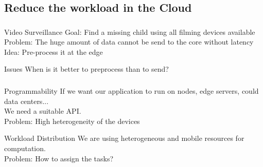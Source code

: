 \documentclass[utf8,xcolor=table, page number]{earlywinter}
\begin{document}
\subsection{Reduce the workload in the Cloud}
\begin{frame}
  \frametitle{\secname}
  \framesubtitle{\subsecname}

  \begin{exampleblock}{Video Surveillance}
    Goal: Find a missing child using all filming devices available\\
    Problem: The huge amount of data cannot be send to the core without latency\\
    Idea: Pre-process it at the edge
  \end{exampleblock}
  
  \begin{alertblock}{Issues}
    When is it better to preprocess than to send?
  \end{alertblock}

\end{frame}

\begin{frame}
  \frametitle{\secname}
  \framesubtitle{\subsecname}
  \begin{alertblock}{Programmability}
    If we want our application to run on nodes, edge servers, could data centers...\\
    We need a suitable API.\\
    Problem: High heterogeneity of the devices
  \end{alertblock}

  \begin{alertblock}{Workload Distribution}
    We are using heterogeneous and mobile resources for computation.\\
    Problem: How to assign the tasks?
  \end{alertblock}
  
\end{frame}
\end{document}
